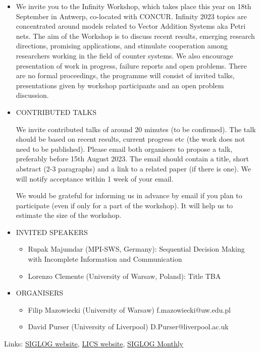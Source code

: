 \documentclass[prodmode,acmtecs]{acmsmall} %
\begin{document}
\begin{itemize}\item  We invite you to the Infinity Workshop, which takes place this year on 18th September in Antwerp, co-located with CONCUR. Infinity 2023 topics are concentrated around models related to Vector Addition Systems aka Petri nets. The aim of the Workshop is to discuss recent results, emerging research directions, promising applications, and stimulate cooperation among researchers working in the field of counter systems. We also encourage presentation of work in progress, failure reports and open problems. There are no formal proceedings, the programme will consist of invited talks, presentations given by workshop participants and an open problem discussion. 
 
\item   CONTRIBUTED TALKS 
 
  We invite contributed talks of around 20 minutes (to be confirmed). The talk should be based on recent results, current progress etc (the work does not need to be published). Please email both organisers to propose a talk, preferably before 15th August 2023. The email should contain a title, short abstract (2-3 paragraphs) and a link to a related paper (if there is one). We will notify acceptance within 1 week of your email. 
 
  We would be grateful for informing us in advance by email if you plan to participate (even if only for a part of the workshop). It will help us to estimate the size of the workshop. 
 
\item  INVITED SPEAKERS 
 
\begin{itemize}\item  Rupak Majumdar (MPI-SWS, Germany): Sequential Decision Making with Incomplete Information and Communication
\item  Lorenzo Clemente (University of Warsaw, Poland): Title TBA
\end{itemize} 
\item  ORGANISERS 
 
\begin{itemize}\item  Filip Mazowiecki (University of Warsaw) f.mazowiecki@uw.edu.pl
\item  David Purser (University of Liverpool) D.Purser@liverpool.ac.uk
\end{itemize} 
\end{itemize}


\bigskip Links: \href{http://siglog.org/}{SIGLOG website}, \href{https://lics.siglog.org}{LICS website}, \href{https://lics.siglog.org/newsletters/}{SIGLOG Monthly}
\end{document}
